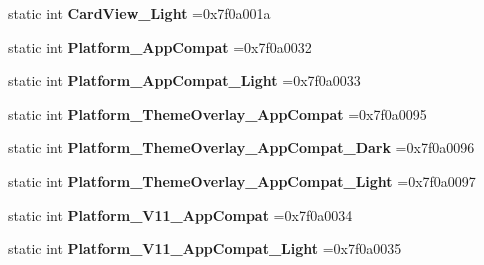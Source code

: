 \begin{DoxyCompactItemize}
static int {\bfseries Card\+View\+\_\+\+Light} =0x7f0a001a
\item 
\mbox{\label{classandroid_1_1support_1_1v7_1_1mediarouter_1_1R_1_1style_a74955f83818c2737d46da76e332d2310}} 
static int {\bfseries Platform\+\_\+\+App\+Compat} =0x7f0a0032
\item 
\mbox{\label{classandroid_1_1support_1_1v7_1_1mediarouter_1_1R_1_1style_a6336f4f47542e1e992a0c2f42d494b1c}} 
static int {\bfseries Platform\+\_\+\+App\+Compat\+\_\+\+Light} =0x7f0a0033
\item 
\mbox{\label{classandroid_1_1support_1_1v7_1_1mediarouter_1_1R_1_1style_a16aea6d90afb5e0f63e9dfae089425db}} 
static int {\bfseries Platform\+\_\+\+Theme\+Overlay\+\_\+\+App\+Compat} =0x7f0a0095
\item 
\mbox{\label{classandroid_1_1support_1_1v7_1_1mediarouter_1_1R_1_1style_a3165a0d75cbc65e6ba132914ac098926}} 
static int {\bfseries Platform\+\_\+\+Theme\+Overlay\+\_\+\+App\+Compat\+\_\+\+Dark} =0x7f0a0096
\item 
\mbox{\label{classandroid_1_1support_1_1v7_1_1mediarouter_1_1R_1_1style_ac9c52044d38619a8e6d89ee04e471d58}} 
static int {\bfseries Platform\+\_\+\+Theme\+Overlay\+\_\+\+App\+Compat\+\_\+\+Light} =0x7f0a0097
\item 
\mbox{\label{classandroid_1_1support_1_1v7_1_1mediarouter_1_1R_1_1style_abb520ef07260730961d77453de638d40}} 
static int {\bfseries Platform\+\_\+\+V11\+\_\+\+App\+Compat} =0x7f0a0034
\item 
\mbox{\label{classandroid_1_1support_1_1v7_1_1mediarouter_1_1R_1_1style_a74b629e00b2d2cdf2fa12cc9e7a94c44}} 
static int {\bfseries Platform\+\_\+\+V11\+\_\+\+App\+Compat\+\_\+\+Light} =0x7f0a0035
\item 
\mbox{\label{classandroid_1_1support_1_1v7_1_1mediarouter_1_1R_1_1style_abdef5b9929a721ad418422ba580b3ada}} 

\end{DoxyCompactItemize}
